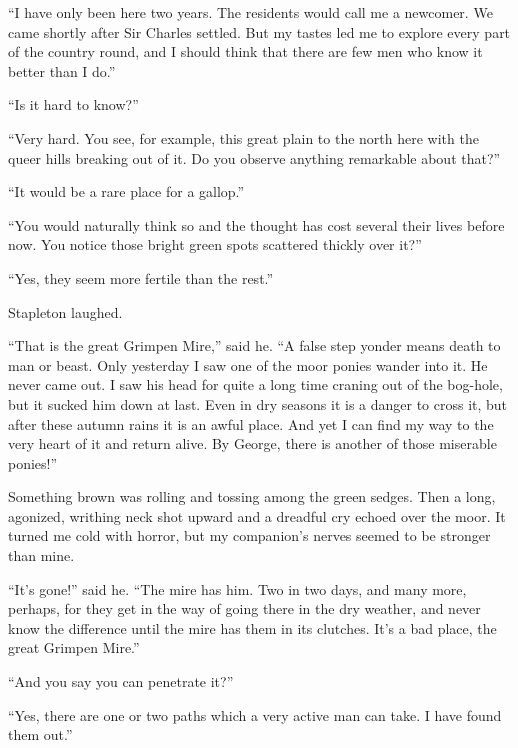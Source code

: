 \documentclass[paper=a5,BCOR=7mm,twoside,DIV=calc,12pt,usegeometry,openany,chapterprefix,endperiod,headings=big]{scrbook} %
\begin{document}
\enquote{I have only been here two years. The residents would call me a newcomer. We came shortly after Sir Charles settled. But my tastes led me to explore every part of the country round, and I should think that there are few men who know it better than I do.}

\enquote{Is it hard to know?}

\enquote{Very hard. You see, for example, this great plain to the north here with the queer hills breaking out of it. Do you observe anything remarkable about that?}

\enquote{It would be a rare place for a gallop.}

\enquote{You would naturally think so and the thought has cost several their lives before now. You notice those bright green spots scattered thickly over it?}

\enquote{Yes, they seem more fertile than the rest.}

Stapleton laughed.

\enquote{That is the great Grimpen Mire,} said he. \enquote{A false step yonder means death to man or beast. Only yesterday I saw one of the moor ponies wander into it. He never came out. I saw his head for quite a long time craning out of the bog-hole, but it sucked him down at last. Even in dry seasons it is a danger to cross it, but after these autumn rains it is an awful place. And yet I can find my way to the very heart of it and return alive. By George, there is another of those miserable ponies!}

Something brown was rolling and tossing among the green sedges. Then a long, agonized, writhing neck shot upward and a dreadful cry echoed over the moor. It turned me cold with horror, but my companion's nerves seemed to be stronger than mine.

\enquote{It's gone!} said he. \enquote{The mire has him. Two in two days, and many more, perhaps, for they get in the way of going there in the dry weather, and never know the difference until the mire has them in its clutches. It's a bad place, the great Grimpen Mire.}

\enquote{And you say you can penetrate it?}

\enquote{Yes, there are one or two paths which a very active man can take. I have found them out.}

\end{document}
